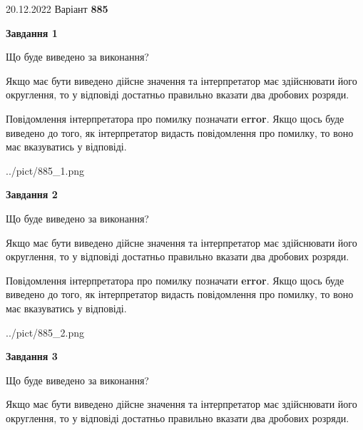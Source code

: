 \documentclass[12pt, ukrainian]{article}
\begin{document}
{20.12.2022 Варіант \No \textbf { 885 }\par}
{
\begin {Large}

{\begin {center}\textbf{Завдання 1}\end {center}}\par
Що буде виведено за виконання? \par

Якщо має бути виведено дійсне значення та інтерпретатор має здійснювати його округлення, 
то у відповіді достатньо правильно вказати два дробових розряди.

Повідомлення інтерпретатора про помилку позначати \textbf{error}.
Якщо щось буде виведено до того, як інтерпретатор видасть повідомлення про помилку, 
то воно має вказуватись у відповіді. \par

\begin{center}
	{../pict/885_1.png}
\end{center}
\newpage

{\begin {center}\textbf{Завдання 2}\end {center}}\par
Що буде виведено за виконання? \par

Якщо має бути виведено дійсне значення та інтерпретатор має здійснювати його округлення, 
то у відповіді достатньо правильно вказати два дробових розряди.

Повідомлення інтерпретатора про помилку позначати \textbf{error}.
Якщо щось буде виведено до того, як інтерпретатор видасть повідомлення про помилку, 
то воно має вказуватись у відповіді. \par

\begin{center}
	{../pict/885_2.png}
\end{center}
\newpage

{\begin {center}\textbf{Завдання 3}\end {center}}\par
Що буде виведено за виконання? \par

Якщо має бути виведено дійсне значення та інтерпретатор має здійснювати його округлення, 
то у відповіді достатньо правильно вказати два дробових розряди.


\end{Large}}
\end{document}
